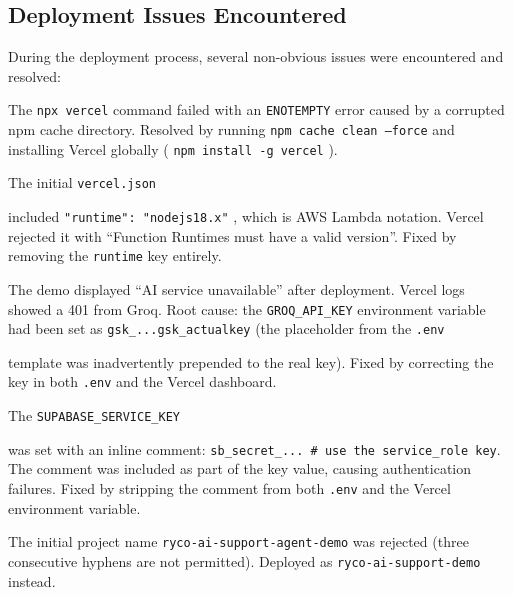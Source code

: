 \documentclass[12pt, a4paper]{article}
\newcommand{\inlinecode}[1]{%
  \colorbox{inlinecode!20}{\texttt{\small #1}}%
}
\begin{document}
\subsection{Deployment Issues Encountered}

During the deployment process, several non-obvious issues were encountered and resolved:

\begin{description}[leftmargin=*, font=\bfseries]
  \item[npx cache corruption (ENOTEMPTY):] The \inlinecode{npx vercel} command failed
        with an \texttt{ENOTEMPTY} error caused by a corrupted npm cache directory.
        Resolved by running \inlinecode{npm cache clean --force} and installing Vercel
        globally (\inlinecode{npm install -g vercel}).

  \item[Invalid runtime key in vercel.json:] The initial \inlinecode{vercel.json}
        included \inlinecode{"runtime": "nodejs18.x"}, which is AWS Lambda notation.
        Vercel rejected it with ``Function Runtimes must have a valid version''.
        Fixed by removing the \inlinecode{runtime} key entirely.

  \item[Groq 401 Unauthorised:] The demo displayed ``AI service unavailable'' after
        deployment. Vercel logs showed a 401 from Groq. Root cause: the
        \inlinecode{GROQ\_API\_KEY} environment variable had been set as
        \texttt{gsk\_...gsk\_actualkey} (the placeholder from the \inlinecode{.env}
        template was inadvertently prepended to the real key). Fixed by correcting the
        key in both \inlinecode{.env} and the Vercel dashboard.

  \item[Supabase key with inline comment:] The \inlinecode{SUPABASE\_SERVICE\_KEY}
        was set with an inline comment:
        \texttt{sb\_secret\_... \# use the service\_role key}. The comment was
        included as part of the key value, causing authentication failures. Fixed by
        stripping the comment from both \inlinecode{.env} and the Vercel environment
        variable.

  \item[Vercel project name restriction:] The initial project name
        \texttt{ryco-ai-support-agent-demo} was rejected (three consecutive hyphens
        are not permitted). Deployed as \texttt{ryco-ai-support-demo} instead.
\end{description}
\end{document}
